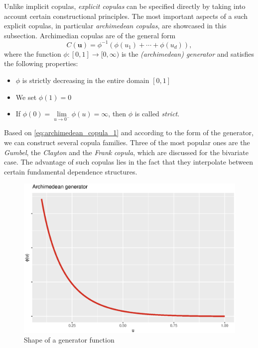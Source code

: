 
Unlike implicit copulas, \textit{explicit copulas} can be specified directly by taking into account certain constructional principles. The most important aspects of a such explicit copulas, in particular \textit{archimedean copulas}, are showcased in this subsection. Archimedian copulas are of the general form
\begin{equation}C(\boldsymbol{u})=\phi^{-1}\left(\phi\left(u_{1}\right)+\cdots+\phi\left(u_{d}\right)\right),
\label{eq:archimedean_copula_1}
\end{equation}
where the function $\phi:[0,1] \rightarrow [0, \infty)$ is the \textit{(archimedean) generator} and satisfies the following properties:
\begin{itemize}
\item $\phi$ is strictly decreasing in the entire domain $[0, 1]$
\item We set $\phi (1) = 0$
\item If  $\phi(0)=\lim \limits _{u \rightarrow 0^{-}} \phi(u)= \infty$, then $\phi$ is called \textit{strict}.
\end{itemize}




Based on \autoref{eq:archimedean_copula_1} and according to the form of the generator, we can construct several copula families. Three of the most popular ones are the \textit{Gumbel}, the \textit{Clayton} and the \textit{Frank} \textit{copula}, which are discussed for the bivariate case. The advantage of such copulas lies in the fact that they interpolate between certain fundamental dependence structures.\\

\begin{figure}[H]
\centering
  \includegraphics[width=.5\linewidth]{figures/archimedean_generator.eps}
  \caption{Shape of a generator function}
  \label{fig:archimedean_generator}
\end{figure}

